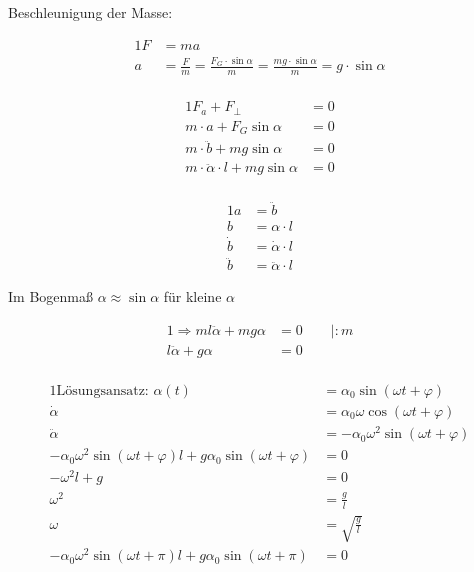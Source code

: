 \documentclass{article}
\begin{document}
	Beschleunigung der Masse:

	\begin{alignat}{1}
		F &= ma\\
		a &= \frac{F}{m} = \frac{F_G \cdot \sin \alpha}{m} = \frac{mg \cdot \sin \alpha}{m} = g \cdot \sin \alpha\\
	\end{alignat}

	\begin{alignat}{1}
		F_a + F_{\perp} &= 0\\
		m \cdot a + F_G \sin \alpha &= 0\\
		m \cdot \ddot{b} + mg\sin \alpha &= 0\\
		m \cdot \ddot{\alpha} \cdot l + m g \sin \alpha &= 0\\
	\end{alignat}

	\begin{alignat}{1}
		a &= \ddot{b}\\
		b &= \alpha \cdot l\\
		\dot{b} &= \dot{\alpha} \cdot l\\
		\ddot{b} &= \ddot{\alpha} \cdot l
	\end{alignat}

	Im Bogenmaß $\alpha \approx \sin \alpha$ für kleine $\alpha$

	\begin{alignat}{1}
		\Rightarrow m l \ddot{\alpha} + m g \alpha &= 0 \qquad \mid : m \\
		l \ddot{\alpha} + g \alpha &= 0\\
	\end{alignat}

	\begin{alignat}{1}
		\text{Lösungsansatz: } \alpha(t) &= \alpha_0 \sin(\omega t + \varphi)\\
		\dot{\alpha}&=\alpha_0\omega \cos(\omega t+\varphi)\\ \ddot{\alpha}&=-\alpha_0\omega^2 \sin(\omega t+\varphi)\\
		-\alpha_0\omega^2 \sin(\omega t+\varphi)l+g\alpha_0\sin(\omega t+\varphi)&=0\\
		-\omega^2 l+g&=0\\
		\omega^2&=\frac gl\\
		\omega&=\sqrt{\frac gl} \\
		-\alpha_0\omega^2 \sin(\omega t+\pi)l+g\alpha_0\sin(\omega t+\pi)&=0
	\end{alignat}
\end{document}
